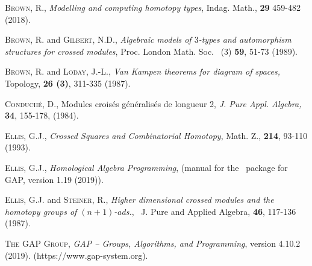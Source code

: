 \documentclass[a4paper,11pt]{article}
\theoremstyle{plain}
\theoremstyle{definition}
\begin{document}
\begin{thebibliography}{99}
	 \textsc{Brown, R.}, 
	\emph{Modelling and computing homotopy types}, 
	Indag. Math., \textbf{29} 459-482 (2018).
	
	
	 \textsc{Brown, R.} and \textsc{Gilbert, N.D.}, 
	\emph{Algebraic models of $3$-types and automorphism structures 
	for crossed modules}, 
	Proc. London Math. Soc. \ (3) \textbf{59}, 51-73 (1989).
	
	 \textsc{Brown, R.} and \textsc{Loday, J.-L.}, 
	\emph{Van Kampen theorems for diagram of spaces,} 
	Topology, \textbf{26 (3)}, 311-335 (1987).
	
	
	
	 \textsc{Conduch\'{e}, D.}, 
	\textrm{Modules crois{\'{e}}s g{\'{e}}n{\'{e}}ralis{\'{e}}s de longueur 2,} 
	\emph{J. Pure Appl. Algebra, } \textbf{34}, 155-178, (1984).
	
	
	 \textsc{Ellis, G.J.}, 
	\emph{Crossed Squares and Combinatorial Homotopy}, 
	Math. Z., \textbf{214}, 93-110 (1993).
	
	 \textsc{Ellis, G.J.}, 
	\emph{Homological Algebra Programming}, 
	{(manual for the \HAP\ package for \textsf{GAP}, version 1.19 (2019))}. 

	 \textsc{Ellis, G.J.} and \textsc{Steiner, R.}, 
	\emph{Higher dimensional crossed modules and the homotopy groups 
	of $(n+1)$-ads.}, \ 
	J. Pure and Applied Algebra, \textbf{46}, 117-136 (1987).
	
	 \textsc{The GAP Group},
	\emph{GAP -- Groups, Algorithms, and Programming}, version 4.10.2 (2019). 
	(https://www.gap-system.org).
	

\end{thebibliography}
\end{document}
